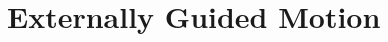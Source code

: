 \documentclass{cslthse-msc}
\begin{document}
%
%
%
%
\chapter{Externally Guided Motion}
\label{sec:EGM}
\end{document}
